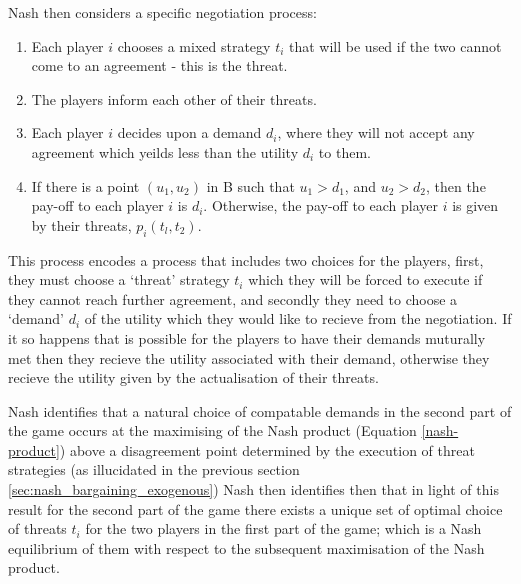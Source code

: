 Nash then considers a specific negotiation process:
\begin{enumerate}
\item Each player $i$ chooses a mixed strategy $t_i$ that will be used if the two cannot come to an agreement - this is the threat.
\item The players inform each other of their threats.
\item Each player $i$ decides upon a demand $d_i$, where they will not accept any agreement which yeilds less than the utility $d_i$ to them.
\item If there is a point $(u_1,u_2)$ in B such that $u_1 > d_1$, and $u_2 > d_2$, then the pay-off to each player $i$ is $d_i$. Otherwise, the pay-off to each player $i$ is given by their threats, $p_i(t_l, t_2)$.
\end{enumerate}

This process encodes a process that includes two choices for the players, first, they must choose a `threat' strategy $t_i$ which they will be forced to execute if they cannot reach further agreement, and secondly they need to choose a `demand' $d_i$ of the utility which they would like to recieve from the negotiation.
If it so happens that is possible for the players to have their demands muturally met then they recieve the utility associated with their demand, otherwise they recieve the utility given by the actualisation of their threats.

Nash identifies that a natural choice of compatable demands in the second part of the game occurs at the maximising of the Nash product (Equation \ref{nash-product}) above a disagreement point determined by the execution of threat strategies (as illucidated in the previous section \ref{sec:nash_bargaining_exogenous})
Nash then identifies then that in light of this result for the second part of the game there exists a unique set of optimal choice of threats $t_i$ for the two players in the first part of the game; which is a Nash equilibrium of them with respect to the subsequent maximisation of the Nash product.

